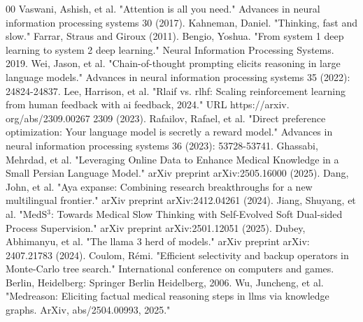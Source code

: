 \documentclass[conference]{IEEEtran}
\begin{document}


	
	
	\begin{thebibliography}{00}
              Vaswani, Ashish, et al. "Attention is all you need." Advances in neural information processing systems 30 (2017).
              Kahneman, Daniel. "Thinking, fast and slow." Farrar, Straus and Giroux (2011).
              Bengio, Yoshua. "From system 1 deep learning to system 2 deep learning." Neural Information Processing Systems. 2019. 
              Wei, Jason, et al. "Chain-of-thought prompting elicits reasoning in large language models." Advances in neural information processing systems 35 (2022): 24824-24837.
              Lee, Harrison, et al. "Rlaif vs. rlhf: Scaling reinforcement learning from human feedback with ai feedback, 2024." URL https://arxiv. org/abs/2309.00267 2309 (2023).
             Rafailov, Rafael, et al. "Direct preference optimization: Your language model is secretly a reward model." Advances in neural information processing systems 36 (2023): 53728-53741.
             Ghassabi, Mehrdad, et al. "Leveraging Online Data to Enhance Medical Knowledge in a Small Persian Language Model." arXiv preprint arXiv:2505.16000 (2025).
             Dang, John, et al. "Aya expanse: Combining research breakthroughs for a new multilingual frontier." arXiv preprint arXiv:2412.04261 (2024).
             Jiang, Shuyang, et al. "MedS$^ 3$: Towards Medical Slow Thinking with Self-Evolved Soft Dual-sided Process Supervision." arXiv preprint arXiv:2501.12051 (2025).
              Dubey, Abhimanyu, et al. "The llama 3 herd of models." arXiv preprint arXiv: 2407.21783 (2024).
             Coulom, Rémi. "Efficient selectivity and backup operators in Monte-Carlo tree search." International conference on computers and games. Berlin, Heidelberg: Springer Berlin Heidelberg, 2006.
             Wu, Juncheng, et al. "Medreason: Eliciting factual medical reasoning steps in llms via knowledge graphs. ArXiv, abs/2504.00993, 2025."

\end{thebibliography}
\end{document}

